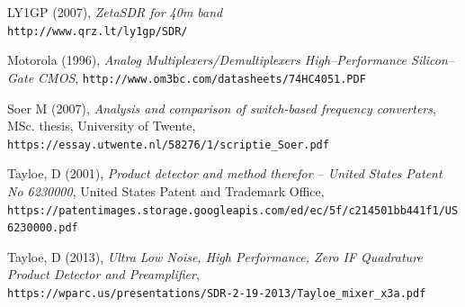 \documentclass[11pt, twoside]{article}
\begin{document}
\begin{thebibliography}{9}
  LY1GP (2007), {\it ZetaSDR for 40m band}
  \\\texttt{http://www.qrz.lt/ly1gp/SDR/}

  Motorola (1996),
  {\it Analog Multiplexers/Demultiplexers High–Performance Silicon–Gate CMOS},
  \texttt{http://www.om3bc.com/datasheets/74HC4051.PDF}

  Soer M (2007), 
  {\it Analysis and comparison of switch-based frequency converters}, MSc. thesis, University of Twente,
\texttt{https://essay.utwente.nl/58276/1/scriptie\_Soer.pdf}

  Tayloe, D (2001), {\it Product detector and method therefor -- United States Patent No 6230000}, United States Patent and Trademark Office,
  \\\texttt{https://patentimages.storage.googleapis.com/ed/ec/5f/c214501bb441f1/US6230000.pdf}

  Tayloe, D (2013), {\it Ultra Low Noise, High Performance, Zero IF Quadrature Product Detector and Preamplifier},
  \\\texttt{https://wparc.us/presentations/SDR-2-19-2013/Tayloe\_mixer\_x3a.pdf}

\end{thebibliography}
\end{document}
